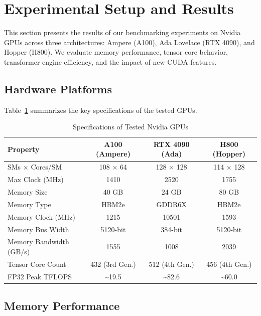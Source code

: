\section{Experimental Setup and Results}

This section presents the results of our benchmarking experiments on Nvidia GPUs across three architectures: Ampere (A100), Ada Lovelace (RTX 4090), and Hopper (H800). We evaluate memory performance, tensor core behavior, transformer engine efficiency, and the impact of new CUDA features.

\subsection{Hardware Platforms}

Table~\ref{tab:gpu_specs} summarizes the key specifications of the tested GPUs.

\begin{table}[H]
\centering
\caption{Specifications of Tested Nvidia GPUs}
\label{tab:gpu_specs}
\begin{tabular}{lccc}
\toprule
\textbf{Property} & \textbf{A100 (Ampere)} & \textbf{RTX 4090 (Ada)} & \textbf{H800 (Hopper)} \\
\midrule
SMs $\times$ Cores/SM    & 108 $\times$ 64     & 128 $\times$ 128    & 114 $\times$ 128 \\
Max Clock (MHz)          & 1410                & 2520                & 1755 \\
Memory Size              & 40 GB               & 24 GB               & 80 GB \\
Memory Type              & HBM2e               & GDDR6X              & HBM2e \\
Memory Clock (MHz)       & 1215                & 10501               & 1593 \\
Memory Bus Width         & 5120-bit            & 384-bit             & 5120-bit \\
Memory Bandwidth (GB/s)  & 1555                & 1008                & 2039 \\
Tensor Core Count        & 432 (3rd Gen.)      & 512 (4th Gen.)      & 456 (4th Gen.) \\
FP32 Peak TFLOPS         & \textasciitilde19.5 & \textasciitilde82.6 & \textasciitilde60.0 \\
\bottomrule
\end{tabular}
\end{table}


\subsection{Memory Performance}

